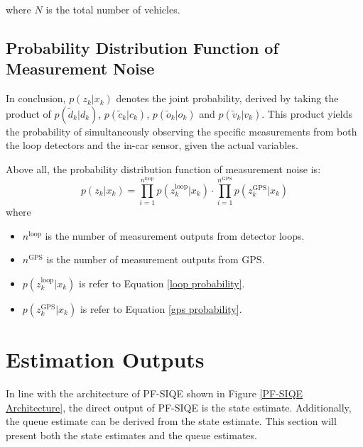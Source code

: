 where \( N \) is the total number of vehicles.

\subsection{Probability Distribution Function of Measurement Noise}
In conclusion, $p(z_k | x_k)$ denotes the joint probability, derived by taking the product of $p(\tilde d_k | d_k)$, $p(\tilde c_k | c_k)$, $p(\tilde o_k | o_k)$ and $p(\tilde v_k | v_k)$. This product yields the probability of simultaneously observing the specific measurements from both the loop detectors and the in-car sensor, given the actual variables. 

Above all, the probability distribution function of measurement noise is:
\begin{equation}
    p(z_k | x_k) = \prod_{i=1}^{n^\text{loop}} p(z_k^\text{loop}| x_k)
   \cdot \prod_{i=1}^{n^\text{GPS}} p(z_k^\text{GPS} | x_k)
\end{equation}
where
\begin{itemize}
    \item $n^\text{loop}$ is the number of measurement outputs from detector loops.
    \item $n^\text{GPS}$ is the number of measurement outputs from GPS.
    \item $p(z_k^\text{loop}| x_k)$ is refer to Equation \ref{loop probability}.
    \item $p(z_k^\text{GPS} | x_k)$ is refer to Equation \ref{gps probability}.
\end{itemize}

\section{Estimation Outputs}
In line with the architecture of PF-SIQE shown in Figure \ref{PF-SIQE Architecture}, the direct output of PF-SIQE is the state estimate. Additionally, the queue estimate can be derived from the state estimate. This section will present both the state estimates and the queue estimates.
